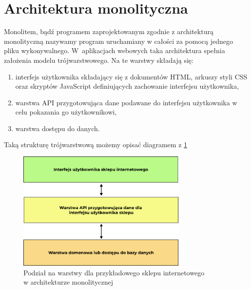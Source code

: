 \documentclass{SGGW-thesis}
\begin{document}
\section{Architektura monolityczna}
Monolitem, bądź programem zaprojektowanym zgodnie z architekturą monolityczną nazywamy program uruchamiany w całości za pomocą jednego pliku wykonywalnego. W~aplikacjach webowych taka architektura spełnia założenia modelu trójwarstwowego. Na te warstwy składają się:

\begin{enumerate}
	\item interfejs użytkownika składający się z dokumentów HTML, arkuszy styli CSS oraz skryptów JavaScript definiujących zachowanie interfejsu użytkownika,
	\item warstwa API przygotowująca dane podawane do interfejsu użytkownika w celu pokazania go użytkownikowi,
	\item warstwa dostępu do danych.
\end{enumerate}

Taką strukturę trójwarstwową możemy opisać diagramem z \cref{fig:monolith_diagram}

\begin{figure}[h]
	\centering
	\captionsetup{justification=centering}
	\includegraphics[width=0.75\textwidth]{monolith_diagram.png}
	\caption{Podział na warstwy dla przykładowego sklepu internetowego \\ w architekturze monolitycznej}
	\label{fig:monolith_diagram}
\end{figure}
\end{document}
